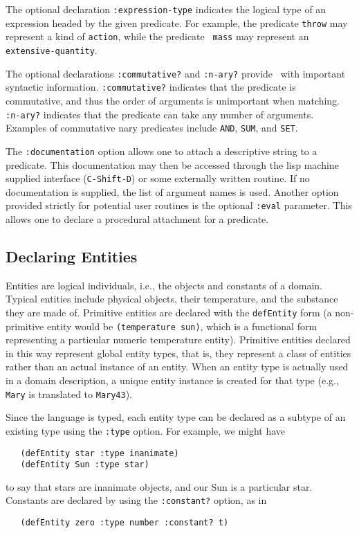 The optional declaration {\tt :expression-type} indicates the logical type
of an expression headed by the given predicate. For example, the predicate
{\tt throw} may represent a kind of {\tt action}, while the predicate {\tt
mass} may represent an {\tt extensive-quantity}.

The optional declarations {\tt :commutative?} and {\tt :n-ary?} provide
\SME\ with important syntactic information.  {\tt :commutative?} indicates
that the predicate is commutative, and thus the order of arguments is
unimportant when matching.  {\tt :n-ary?} indicates that the predicate can
take any number of arguments.  Examples of commutative nary predicates include
{\tt AND}, {\tt SUM}, and {\tt SET}.

The {\tt :documentation} option allows one to attach a descriptive string to
a predicate. This documentation may then be accessed through the lisp
machine supplied interface
({\tt C-Shift-D}) or some externally written routine. If no documentation is
supplied, the list of argument names is used.  Another option provided
strictly for potential user routines is the optional {\tt :eval} parameter.
This allows one to declare a procedural attachment for a predicate.


\subsection{Declaring Entities}

\indent
{}

Entities are logical individuals, i.e., the objects and constants of a
domain. Typical entities include physical objects, their temperature, and
the substance they are made of.  Primitive entities are declared with the
{\tt defEntity} form (a non-primitive entity would be {\tt (temperature
sun)}, which is a functional form representing a particular numeric
temperature entity). Primitive entities declared in this way represent
global entity types, that is, they represent a class of entities rather than
an actual instance of an entity. When an entity type is actually used in a
domain description, a unique entity instance is created for that type (e.g.,
{\tt Mary} is translated to {\tt Mary43}).

Since the language is typed, each entity type can be declared as
a subtype of an existing type using the {\tt :type} option.
For example, we might have
\begin{verbatim}
   (defEntity star :type inanimate)
   (defEntity Sun :type star)
\end{verbatim}
to say that stars are inanimate objects, and our Sun is a particular star.
Constants are declared by using the {\tt :constant?} option, as in
\begin{verbatim}
   (defEntity zero :type number :constant? t)
\end{verbatim}


